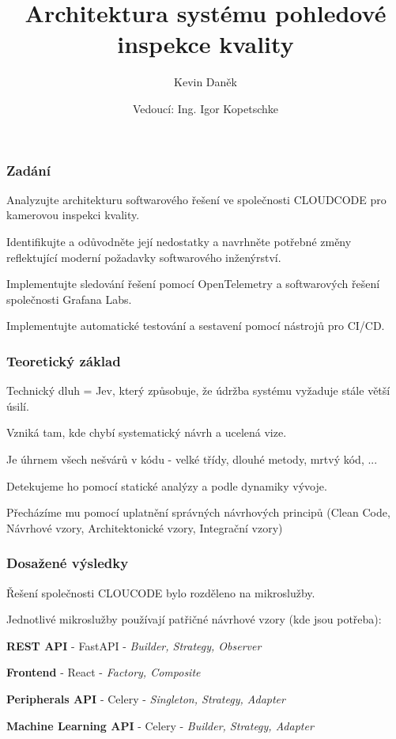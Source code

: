 \documentclass[FM]{tulpresentation}
\title{Architektura systému pohledové inspekce kvality}
\subtitle{Kevin Daněk}
\author{Vedoucí: Ing. Igor Kopetschke}
\begin{document}
\TULtitleframe

\begin{frame}
	\frametitle{Zadání}
	\begin{items}
		\item Analyzujte architekturu softwarového řešení ve společnosti CLOUDCODE pro kamerovou inspekci kvality.
		\item Identifikujte a odůvodněte její nedostatky a navrhněte potřebné změny reflektující moderní požadavky softwarového inženýrství.
		\item Implementujte sledování řešení pomocí OpenTelemetry a softwarových řešení společnosti Grafana Labs.
		\item Implementujte automatické testování a sestavení pomocí nástrojů pro CI/CD.
	\end{items}
\end{frame}

\begin{frame}
	\frametitle{Teoretický základ}
	\begin{items}
		\item Technický dluh = Jev, který způsobuje, že údržba systému vyžaduje stále větší úsilí.
		\begin{subitems}
		\item Vzniká tam, kde chybí systematický návrh a ucelená vize.
		\item Je úhrnem všech nešvárů v kódu - velké třídy, dlouhé metody, mrtvý kód, ...
		\item Detekujeme ho pomocí statické analýzy a podle dynamiky vývoje.
		\item Přecházíme mu pomocí uplatnění správných návrhových principů (Clean Code, Návrhové vzory, Architektonické vzory, Integrační vzory)
	 	\end{subitems}
	\end{items}
\end{frame}

\begin{frame}
	\frametitle{Dosažené výsledky}
	\begin{items}
		\item Řešení společnosti CLOUCODE bylo rozděleno na mikroslužby.
		\item Jednotlivé mikroslužby používají patřičné návrhové vzory (kde jsou potřeba):
		\begin{subitems}
			\item \textbf{REST API} - FastAPI - \textit{Builder, Strategy, Observer}
			\item \textbf{Frontend} - React - \textit{Factory, Composite}
			\item \textbf{Peripherals API} - Celery - \textit{Singleton, Strategy, Adapter}
			\item \textbf{Machine Learning API} - Celery - \textit{Builder, Strategy, Adapter}
		\end{subitems}
	\end{items}
\end{frame}
\end{document}
